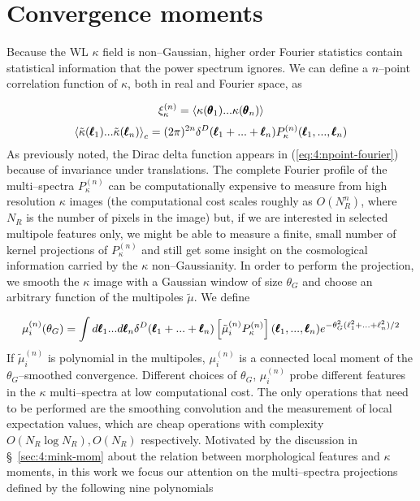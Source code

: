 
\section{Convergence moments}
\label{sec:4:moments}
Because the WL $\kappa$ field is non--Gaussian, higher order Fourier statistics contain statistical information that the power spectrum ignores. We can define a $n$--point correlation function of $\kappa$, both in real and Fourier space, as

\begin{equation}
\label{eq:4:npoint-real}
\xi^{(n)}_\kappa = \left\langle\kappa(\pmb{\theta}_1)...\kappa(\pmb{\theta}_n)\right\rangle
\end{equation}
%
\begin{equation}
\label{eq:4:npoint-fourier}
\left\langle\tilde{\kappa}(\pmb{\ell}_1)...\tilde{\kappa}(\pmb{\ell}_n)\right\rangle_c = (2\pi)^{2n} \delta^D(\pmb{\ell}_1+...+\pmb{\ell}_n)P_\kappa^{(n)}(\pmb{\ell}_1,...,\pmb{\ell}_n)
\end{equation}
%
As previously noted, the Dirac delta function appears in (\ref{eq:4:npoint-fourier}) because of invariance under translations. The complete Fourier profile of the multi--spectra $P^{(n)}_\kappa$ can be computationally expensive to measure from high resolution $\kappa$ images (the computational cost scales roughly as $O(N_R^n)$, where $N_R$ is the number of pixels in the image) but, if we are interested in selected multipole features only, we might be able to measure a finite, small number of kernel projections of $P^{(n)}_\kappa$ and still get some insight on the cosmological information carried by the $\kappa$ non--Gaussianity. In order to perform the projection, we smooth the $\kappa$ image with a Gaussian window of size $\theta_G$ and choose an arbitrary function of the multipoles $\tilde{\mu}$. We define

\begin{equation}
\label{eq:4:npoint-projection}
\mu^{(n)}_i(\theta_G) = \int d\pmb{\ell}_1...d\pmb{\ell}_n \delta^D(\pmb{\ell}_1+...+\pmb{\ell}_n)\left[\tilde{\mu}^{(n)}_iP_\kappa^{(n)}\right](\pmb{\ell}_1,...,\pmb{\ell}_n)e^{-\theta_G^2(\ell_1^2+...+\ell_n^2)/2}
\end{equation}
%
If $\tilde{\mu}^{(n)}_i$ is polynomial in the multipoles, $\mu^{(n)}_i$ is a connected local moment of the $\theta_G$--smoothed convergence. Different choices of $\theta_G$, $\mu^{(n)}_i$ probe different features in the $\kappa$ multi--spectra at low computational cost. The only operations that need to be performed are the smoothing convolution and the measurement of local expectation values, which are cheap operations with complexity $O(N_R\log N_R), O(N_R)$ respectively. Motivated by the discussion in \S~\ref{sec:4:mink-mom} about the relation between morphological features and $\kappa$ moments, in this work we focus our attention on the multi--spectra projections defined by the following nine polynomials

